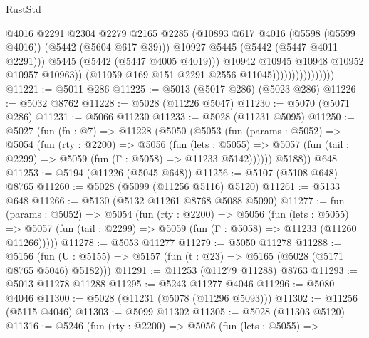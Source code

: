 \begin{lexlean}{RustStd}
\begin{coremodule}
                                          @4016
                                          @2291
                                          @2304
                                          @2279
                                          @2165
                                          @2285
                                          (@10893
                                            @617
                                            @4016
                                            (@5598 (@5599 @4016))
                                            (@5442 (@5604 @617 @39)))
                                          @10927
                                          @5445
                                          (@5442 (@5447 @4011 @2291)))
                                        @5445
                                        (@5442 (@5447 @4005 @4019)))
                                      @10942
                                      @10945
                                      @10948
                                      @10952
                                      @10957
                                      @10963))
                                  (@11059 @169 @151 @2291 @2556 @11045))))))))))))))))
@11221 := @5011 @286
@11225 := @5013 (@5017 @286) (@5023 @286)
@11226 := @5032 @8762
@11228 := @5028 (@11226 @5047)
@11230 := @5070 (@5071 @286)
@11231 := @5066 @11230
@11233 := @5028 (@11231 @5095)
@11250 := @5027
    (fun (fn : @7) =>
    @11228
      (@5050
        (@5053
          (fun (params : @5052) =>
          @5054
            (fun (rty : @2200) =>
            @5056
              (fun (lets : @5055) =>
              @5057 (fun (tail : @2299) => @5059 (fun (Γ : @5058) => @11233 @5142))))))
        @5188))
    @648
@11253 := @5194 (@11226 (@5045 @648))
@11256 := @5107 (@5108 @648) @8765
@11260 := @5028 (@5099 (@11256 @5116) @5120)
@11261 := @5133 @648
@11266 := @5130 (@5132 @11261 @8768 @5088 @5090)
@11277 := fun (params : @5052) =>
  @5054
    (fun (rty : @2200) =>
    @5056
      (fun (lets : @5055) =>
      @5057 (fun (tail : @2299) => @5059 (fun (Γ : @5058) => @11233 (@11260 @11266)))))
@11278 := @5053 @11277
@11279 := @5050 @11278
@11288 := @5156
    (fun (U : @5155) => @5157 (fun (t : @23) => @5165 (@5028 (@5171 @8765 @5046) @5182)))
@11291 := @11253 (@11279 @11288) @8763
@11293 := @5013 @11278 @11288
@11295 := @5243 @11277 @4046
@11296 := @5080 @4046
@11300 := @5028 (@11231 (@5078 (@11296 @5093)))
@11302 := @11256 (@5115 @4046)
@11303 := @5099 @11302
@11305 := @5028 (@11303 @5120)
@11316 := @5246
    (fun (rty : @2200) =>
    @5056
      (fun (lets : @5055) =>

\end{coremodule}
\end{lexlean}
